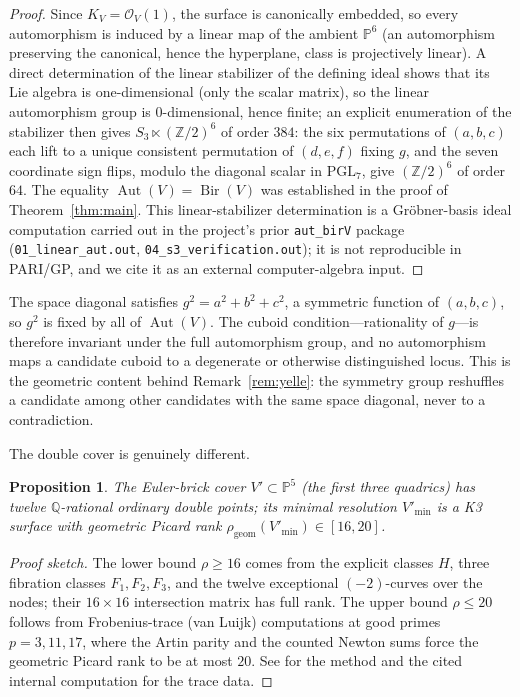 \documentclass[11pt,reqno]{amsart}
\theoremstyle{plain}
\newtheorem{proposition}[theorem]{Proposition}
\theoremstyle{definition}
\theoremstyle{remark}
\newcommand{\Q}{\mathbb{Q}}
\newcommand{\Z}{\mathbb{Z}}
\newcommand{\PP}{\mathbb{P}}
\newcommand{\Aut}{\operatorname{Aut}}
\newcommand{\Bir}{\operatorname{Bir}}
\begin{document}
\begin{proof}
Since $K_V=\mathcal{O}_V(1)$, the surface is canonically embedded, so every
automorphism is induced by a linear map of the ambient $\PP^6$ (an automorphism
preserving the canonical, hence the hyperplane, class is projectively linear).
A direct determination of the linear stabilizer of the defining ideal shows that its
Lie algebra is one-dimensional (only the scalar matrix), so the linear automorphism group
is $0$-dimensional, hence finite; an explicit enumeration of the stabilizer then gives
$S_3\ltimes(\Z/2)^6$ of order $384$: the six permutations of $(a,b,c)$ each lift to a
unique consistent permutation of $(d,e,f)$ fixing $g$, and the seven coordinate sign
flips, modulo the diagonal scalar in $\mathrm{PGL}_7$, give $(\Z/2)^6$ of order $64$. The
equality $\Aut(V)=\Bir(V)$ was established in the proof of Theorem~\ref{thm:main}. This
linear-stabilizer determination is a Gr\"obner-basis ideal computation carried out in the
project's prior \texttt{aut\_birV} package (\texttt{01\_linear\_aut.out},
\texttt{04\_s3\_verification.out}); it is not reproducible in PARI/GP, and we cite it as
an external computer-algebra input.
\end{proof}

The space diagonal satisfies $g^2=a^2+b^2+c^2$, a symmetric function of $(a,b,c)$, so
$g^2$ is fixed by all of $\Aut(V)$. The cuboid condition---rationality of $g$---is
therefore invariant under the full automorphism group, and no automorphism maps a
candidate cuboid to a degenerate or otherwise distinguished locus. This is the
geometric content behind Remark~\ref{rem:yelle}: the symmetry group reshuffles a
candidate among other candidates with the same space diagonal, never to a
contradiction.

The double cover is genuinely different.

\begin{proposition}\label{prop:k3}
The Euler-brick cover $V'\subset\PP^5$ (the first three quadrics) has twelve
$\Q$-rational ordinary double points; its minimal resolution $V'_{\min}$ is a K3
surface with geometric Picard rank $\rho_{\mathrm{geom}}(V'_{\min})\in[16,20]$.
\end{proposition}

\begin{proof}[Proof sketch]
The lower bound $\rho\ge 16$ comes from the explicit classes $H$, three fibration
classes $F_1,F_2,F_3$, and the twelve exceptional $(-2)$-curves over the nodes; their
$16\times16$ intersection matrix has full rank. The upper bound $\rho\le 20$ follows
from Frobenius-trace (van Luijk) computations at good primes $p=3,11,17$, where the
Artin parity and the counted Newton sums force the geometric Picard rank to be at
most $20$. See \cite{vanLuijk} for the method and the cited internal computation for
the trace data.
\end{proof}
\end{document}
